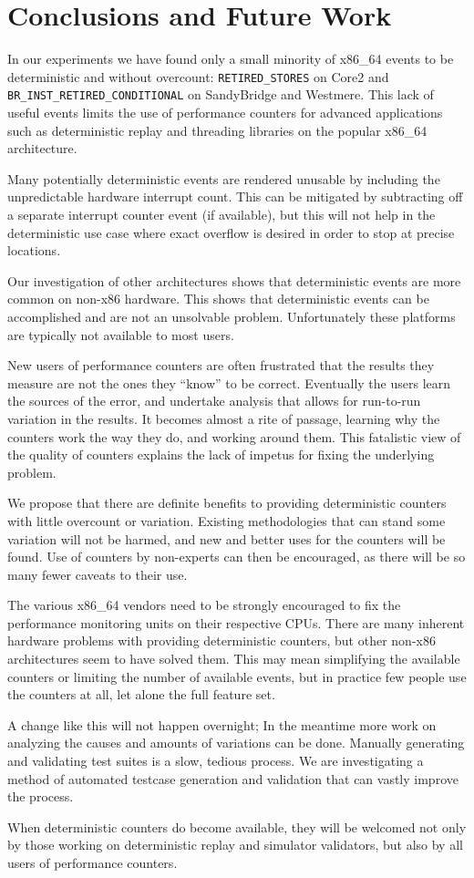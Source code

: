 \section{Conclusions and Future Work}
In our experiments we have found only a small minority of
x86\_64 events to be deterministic and without overcount:
{\tt RETIRED\_STORES} on Core2 and 
{\tt BR\_INST\_RETIRED\_CONDITIONAL} on SandyBridge and Westmere.
This lack of useful events limits 
the use of performance counters for advanced applications such
as deterministic replay and threading libraries on the popular x86\_64
architecture.  

Many potentially deterministic events are rendered unusable
by including the unpredictable hardware interrupt count.
This can be mitigated by subtracting off a separate
interrupt counter event (if available),
but this will not help in the deterministic
use case where exact overflow is desired in order to 
stop at precise locations.  

Our investigation of other architectures shows that
deterministic events are more common on non-x86 hardware.
This shows that deterministic events can be accomplished
and are not an unsolvable problem.  Unfortunately 
these platforms are typically not available to most
users.

New users of performance counters are often frustrated that the results
they measure are not the ones they ``know'' to be correct.
Eventually the users learn the sources of the error, and undertake 
analysis that allows for run-to-run variation in the results.
It becomes almost a rite of passage, learning why the counters work
the way they do, and working around them.  This fatalistic view
of the quality of counters explains the lack of
impetus for fixing the underlying problem.

We propose that there are definite benefits to providing deterministic
counters with little overcount or variation.  
Existing methodologies that can stand some variation will not be harmed, 
and new and better uses for the counters will be found.  
Use of counters by non-experts can then be encouraged, 
as there will be so many fewer caveats to their use.

The various x86\_64 vendors need to be strongly encouraged
to fix the performance monitoring units on their respective CPUs.
There are many inherent hardware problems with providing deterministic
counters, but other non-x86 architectures seem to have solved them.
This may mean simplifying the available counters or limiting the
number of available events, but in practice few people use the counters
at all, let alone the full feature set.

A change like this will not happen overnight;
In the meantime more work on analyzing the causes and amounts
of variations can be done.  Manually generating and validating
test suites is a slow, tedious process.  We are investigating
a method of automated testcase generation and validation that
can vastly improve the process.

When deterministic counters do become available, they will
be welcomed not only by those working on deterministic replay and simulator
validators, but also by all users of performance counters.  


